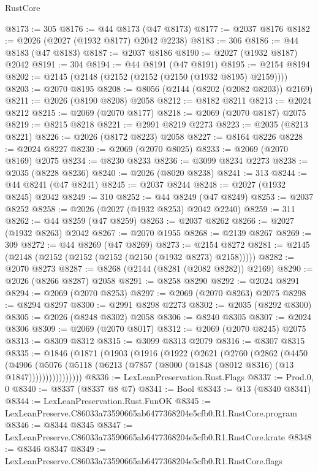 \begin{lexlean}{RustCore}
\begin{coremodule}
@8173 := 305
@8176 := @44 @8173 (@47 @8173)
@8177 := @2037 @8176
@8182 := @2026 (@2027 (@1932 @8177) @2042 @2238)
@8183 := 306
@8186 := @44 @8183 (@47 @8183)
@8187 := @2037 @8186
@8190 := @2027 (@1932 @8187) @2042
@8191 := 304
@8194 := @44 @8191 (@47 @8191)
@8195 := @2154 @8194
@8202 := @2145 (@2148 (@2152 (@2152 (@2150 (@1932 @8195) @2159))))
@8203 := @2070 @8195
@8208 := @8056 (@2144 (@8202 (@2082 @8203)) @2169)
@8211 := @2026 (@8190 @8208) @2058
@8212 := @8182 @8211
@8213 := @2024 @8212
@8215 := @2069 (@2070 @8177)
@8218 := @2069 (@2070 @8187) @2075
@8219 := @8215 @8218
@8221 := @2991 @8219 @2273
@8223 := @2035 (@8213 @8221)
@8226 := @2026 (@8172 @8223) @2058
@8227 := @8164 @8226
@8228 := @2024 @8227
@8230 := @2069 (@2070 @8025)
@8233 := @2069 (@2070 @8169) @2075
@8234 := @8230 @8233
@8236 := @3099 @8234 @2273
@8238 := @2035 (@8228 @8236)
@8240 := @2026 (@8020 @8238)
@8241 := 313
@8244 := @44 @8241 (@47 @8241)
@8245 := @2037 @8244
@8248 := @2027 (@1932 @8245) @2042
@8249 := 310
@8252 := @44 @8249 (@47 @8249)
@8253 := @2037 @8252
@8258 := @2026 (@2027 (@1932 @8253) @2042 @2240)
@8259 := 311
@8262 := @44 @8259 (@47 @8259)
@8263 := @2037 @8262
@8266 := @2027 (@1932 @8263) @2042
@8267 := @2070 @1955
@8268 := @2139 @8267
@8269 := 309
@8272 := @44 @8269 (@47 @8269)
@8273 := @2154 @8272
@8281 := @2145 (@2148 (@2152 (@2152 (@2152 (@2150 (@1932 @8273) @2158)))))
@8282 := @2070 @8273
@8287 := @8268 (@2144 (@8281 (@2082 @8282)) @2169)
@8290 := @2026 (@8266 @8287) @2058
@8291 := @8258 @8290
@8292 := @2024 @8291
@8294 := @2069 (@2070 @8253)
@8297 := @2069 (@2070 @8263) @2075
@8298 := @8294 @8297
@8300 := @2991 @8298 @2273
@8302 := @2035 (@8292 @8300)
@8305 := @2026 (@8248 @8302) @2058
@8306 := @8240 @8305
@8307 := @2024 @8306
@8309 := @2069 (@2070 @8017)
@8312 := @2069 (@2070 @8245) @2075
@8313 := @8309 @8312
@8315 := @3099 @8313 @2079
@8316 := @8307 @8315
@8335 := @1846
    (@1871
      (@1903
        (@1916
          (@1922
            (@2621
              (@2760
                (@2862
                  (@4450
                    (@4906
                      (@5076
                        (@5118 (@6213 (@7857 (@8000 (@1848 (@8012 @8316) (@13 @1847))))))))))))))))
@8336 := LexLeanPreservation.Rust.Flags
@8337 := Prod.{0, 0}
@8340 := @8337 (@8337 @8 @7)
@8341 := Bool
@8343 := @13 (@8340 @8341)
@8344 := LexLeanPreservation.Rust.FunOK
@8345 := LexLeanPreserve.C86033a73590665ab6477368204e5cfb0.R1.RustCore.program
@8346 := @8344 @8345
@8347 := LexLeanPreserve.C86033a73590665ab6477368204e5cfb0.R1.RustCore.krate
@8348 := @8346 @8347
@8349 := LexLeanPreserve.C86033a73590665ab6477368204e5cfb0.R1.RustCore.flags

\end{coremodule}
\end{lexlean}
